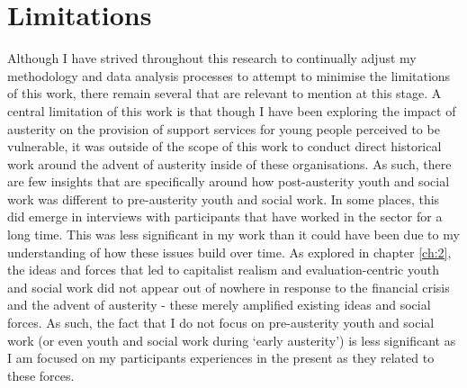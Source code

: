 \section{Limitations}

Although I have strived throughout this research to continually adjust my methodology and data analysis processes to attempt to minimise the limitations of this work, there remain several that are relevant to mention at this stage. A central limitation of this work is that though I have been exploring the impact of austerity on the provision of support services for young people perceived to be vulnerable, it was outside of the scope of this work to conduct direct historical work around the advent of austerity inside of these organisations. As such, there are few insights that are specifically around how post-austerity youth and social work was different to pre-austerity youth and social work. In some places, this did emerge in interviews with participants that have worked in the sector for a long time. This was less significant in my work than it could have been due to my understanding of how these issues build over time. As explored in chapter \ref{ch:2}, the ideas and forces that led to capitalist realism and evaluation-centric youth and social work did not appear out of nowhere in response to the financial crisis and the advent of austerity - these merely amplified existing ideas and social forces. As such, the fact that I do not focus on pre-austerity youth and social work (or even youth and social work during `early austerity') is less significant as I am focused on my participants experiences in the present as they related to these forces. 

